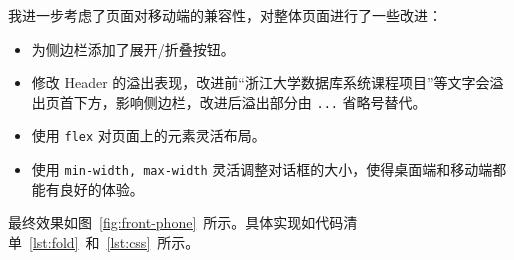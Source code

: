 \documentclass[a4paper,oneside]{ctexbook}
\begin{document}
我进一步考虑了页面对移动端的兼容性，对整体页面进行了一些改进：

\begin{itemize}
    \item 为侧边栏添加了展开/折叠按钮。
    \item 修改 Header 的溢出表现，改进前“浙江大学数据库系统课程项目”等文字会溢出页首下方，影响侧边栏，改进后溢出部分由 \verb|...| 省略号替代。
    \item 使用 \verb|flex| 对页面上的元素灵活布局。
    \item 使用 \verb|min-width, max-width| 灵活调整对话框的大小，使得桌面端和移动端都能有良好的体验。
\end{itemize}

最终效果如图~\ref{fig:front-phone}~所示。具体实现如代码清单~\ref{lst:fold}~和~\ref{lst:css}~所示。
\end{document}
